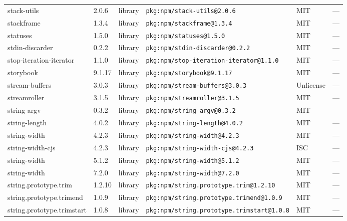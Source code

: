 \documentclass[11pt,a4paper]{article}
\begin{document}
\begin{longtable}{|p{4cm}|p{2cm}|p{1.6cm}|p{5cm}|p{1.5cm}|p{3.5cm}|}
\raggedright stack-utils & 2.0.6 & library & \small\texttt{pkg:npm/stack-utils@2.0.6} & MIT & \small — \\
\raggedright stackframe & 1.3.4 & library & \small\texttt{pkg:npm/stackframe@1.3.4} & MIT & \small — \\
\raggedright statuses & 1.5.0 & library & \small\texttt{pkg:npm/statuses@1.5.0} & MIT & \small — \\
\raggedright stdin-discarder & 0.2.2 & library & \small\texttt{pkg:npm/stdin-discarder@0.2.2} & MIT & \small — \\
\raggedright stop-iteration-iterator & 1.1.0 & library & \small\texttt{pkg:npm/stop-iteration-iterator@1.1.0} & MIT & \small — \\
\raggedright storybook & 9.1.17 & library & \small\texttt{pkg:npm/storybook@9.1.17} & MIT & \small — \\
\raggedright stream-buffers & 3.0.3 & library & \small\texttt{pkg:npm/stream-buffers@3.0.3} & Unlicense & \small — \\
\raggedright streamroller & 3.1.5 & library & \small\texttt{pkg:npm/streamroller@3.1.5} & MIT & \small — \\
\raggedright string-argv & 0.3.2 & library & \small\texttt{pkg:npm/string-argv@0.3.2} & MIT & \small — \\
\raggedright string-length & 4.0.2 & library & \small\texttt{pkg:npm/string-length@4.0.2} & MIT & \small — \\
\raggedright string-width & 4.2.3 & library & \small\texttt{pkg:npm/string-width@4.2.3} & MIT & \small — \\
\raggedright string-width-cjs & 4.2.3 & library & \small\texttt{pkg:npm/string-width-cjs@4.2.3} & ISC & \small — \\
\raggedright string-width & 5.1.2 & library & \small\texttt{pkg:npm/string-width@5.1.2} & MIT & \small — \\
\raggedright string-width & 7.2.0 & library & \small\texttt{pkg:npm/string-width@7.2.0} & MIT & \small — \\
\raggedright string.prototype.trim & 1.2.10 & library & \small\texttt{pkg:npm/string.prototype.trim@1.2.10} & MIT & \small — \\
\raggedright string.prototype.trimend & 1.0.9 & library & \small\texttt{pkg:npm/string.prototype.trimend@1.0.9} & MIT & \small — \\
\raggedright string.prototype.trimstart & 1.0.8 & library & \small\texttt{pkg:npm/string.prototype.trimstart@1.0.8} & MIT & \small — \\

\end{longtable}
\end{document}
